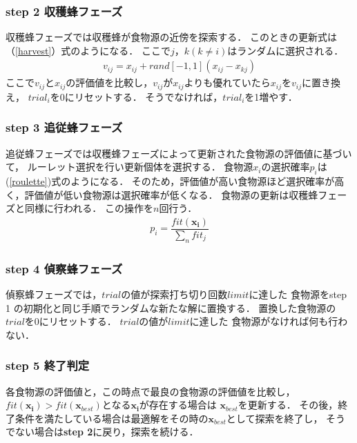 \subsubsection*{step 2 収穫蜂フェーズ}
収穫蜂フェーズでは収穫蜂が食物源の近傍を探索する．
このときの更新式は（\ref{harvest}）式のようになる．
ここで$j，k(k\neq i)$はランダムに選択される．
\begin{align}
v_{ij} = x_{ij} + rand[-1,1](x_{ij}-x_{kj})\label{harvest}
\end{align}
ここで$v_{ij}$と$x_{ij}$の評価値を比較し，$v_{ij}$が$x_{ij}$よりも優れていたら$x_{ij}$を$v_{ij}$に置き換え，
$trial_i$を0にリセットする．
そうでなければ，$trial_i$を1増やす．
\subsubsection*{step 3 追従蜂フェーズ}
追従蜂フェーズでは収穫蜂フェーズによって更新された食物源の評価値に基づいて，
ルーレット選択を行い更新個体を選択する．
食物源$x_i$の選択確率$p_i$は(\ref{roulette})式のようになる．
そのため，評価値が高い食物源ほど選択確率が高く，評価値が低い食物源は選択確率が低くなる．
食物源の更新は収穫蜂フェーズと同様に行われる．
この操作を$n$回行う．
\begin{align}
    p_i = \dfrac{fit(\boldsymbol{x_{i}})}{\sum_{n}fit_j}\label{roulette}
\end{align}
\subsubsection*{step 4 偵察蜂フェーズ}
偵察蜂フェーズでは，$trial$の値が探索打ち切り回数$limit$に達した
食物源をstep 1 の初期化と同じ手順でランダムな新たな解に置換する． 
置換した食物源の$trial$を0にリセットする．
$trial$の値が$limit$に達した
食物源がなければ何も行わない．
\subsubsection*{step 5 終了判定}
各食物源の評価値と，この時点で最良の食物源の評価値を比較し，
$fit(\boldsymbol{x_{i}}) > fit(\boldsymbol{x}_{best})$となる$\boldsymbol{x_{i}}$が存在する場合は
$\boldsymbol{x}_{best}$を更新する．
その後，終了条件を満たしている場合は最適解をその時の$\boldsymbol{x}_{best}$として探索を終了し，
そうでない場合は\textbf{step 2}に戻り，探索を続ける．
